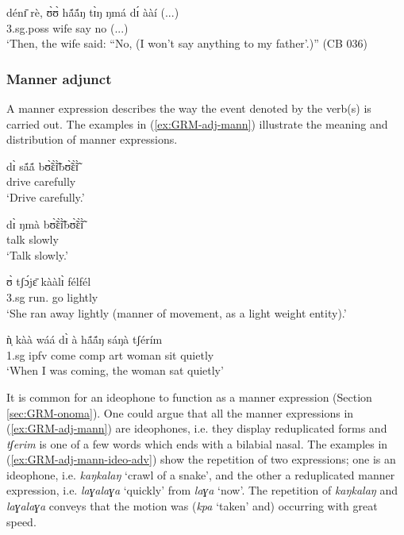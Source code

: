 \begin{exe}
\begin{exe}
\begin{exe}
\ea\label{ex:GRM-adj-temp-thereupon}
\gll dénɪ̄      rè,           ʊ̀ʊ̀               hã́ã́ŋ   tɪ̀ŋ 
ŋmá   dɪ́     ààí (...) \\
 {\advt}   {\foc}     {\sc 3.sg.poss}  wife     {\art}  say   {\comp} 
no    (...)\\
  `Then, the wife said: ``No, (I won't
say
anything to my father'.)'' (CB 036)
\z




\subsubsection{Manner adjunct}
\label{sec:GRM-manner-adv}

A manner  expression describes the way the event denoted by
the verb(s) is carried out. The examples in (\ref{ex:GRM-adj-mann}) illustrate
the meaning and distribution of  manner expressions.


\ea\label{ex:GRM-adj-mann}


\ea\label{ex:GRM-adj-mann-carefully}
\gll dɪ̀ sã́ã́ bʊ̃̀ɛ̃̀ɪ̃̀bʊ̃̀ɛ̃̀ɪ̃̀ \\
{\comp} drive {carefully}\\
\glt `Drive carefully.'

\ex\label{ex:GRM-adj-mann-slowly}
\gll dɪ̀ ŋmà bʊ̃̀ɛ̃̀ɪ̃̀bʊ̃̀ɛ̃̀ɪ̃̀\\
{\comp} talk {slowly}\\
\glt `Talk slowly.'

\ex\label{ex:GRM-adj-mann-lighly}
\gll ʊ̀ tʃɔ́jɛ̄ kààlɪ̀ félfél\\
 {\sc 3.sg} run.{\pfv} go {lightly} \\
\glt `She ran away lightly (manner of movement, as a light weight
entity).'

\ex\label{ex:GRM-adj-mann-silently}
\gll  ǹ̩ kàà wáá dɪ̀ à   hã́ã́ŋ     sáŋà   tʃérím \\
{\sc 1.sg} {\sc ipfv} come {\sc comp} {\sc art} woman sit quietly\\
\glt `When I was coming, the woman sat quietly' 

\z 
 \z

It is common for an ideophone to function as a manner expression 
 (Section \ref{sec:GRM-onoma}). One could argue that  all the manner 
expressions in
(\ref{ex:GRM-adj-mann}) are ideophones, i.e. they display reduplicated forms
and {\it tʃerim} is one of a few words which ends with a bilabial nasal. The
examples in (\ref{ex:GRM-adj-mann-ideo-adv}) show the repetition of two
expressions; one is an ideophone, i.e. {\it kaŋkalaŋ} `crawl of a 
snake', and the
other  a  reduplicated  manner expression,  i.e. {\it 
laɣalaɣa} 
`quickly' from {\it laɣa} 
`now'. The
repetition of {\it kaŋkalaŋ} and {\it  laɣalaɣa} conveys that the motion was
({\it kpa} `taken'  and) occurring with great speed.


\end{exe}
\end{exe}
\end{exe}
